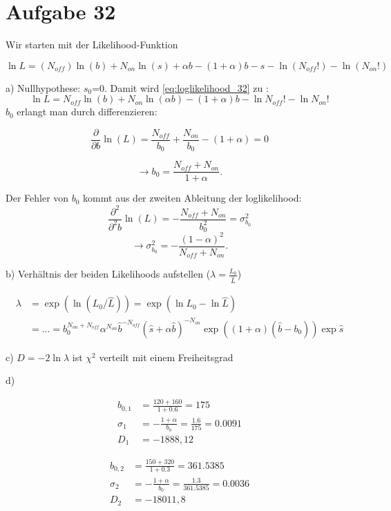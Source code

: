 \section{Aufgabe 32}

Wir starten mit der Likelihood-Funktion

\begin{equation}
	\ln L = (N_{off}) \ln (b) + N_{on} \ln (s) +\alpha b -(1+\alpha) b - s - \ln (N_{off}!) - \ln (N_{on}!)
	\label{eq:loglikelihood_32}
\end{equation}

a) Nullhypothese: $s_0$=0. Damit wird \eqref{eq:loglikelihood_32} zu :
\begin{equation}
	\ln L = N_{off} \ln (b) + N_{on} \ln (\alpha b) -(1+\alpha) b - \ln N_{off}! - \ln N_{on}!
\end{equation}
$b_0$ erlangt man durch differenzieren:

\begin{equation}
	\frac{\partial}{\partial b} \ln (L) = \frac{N_{off}}{b_0} + \frac{N_{on}}{b_0} -(1+\alpha) = 0
\end{equation}

\begin{equation}
	\rightarrow b_0 = \frac{N_{off} + N_{on}}{1+\alpha}.
\end{equation}

Der Fehler von $b_0$ kommt aus der zweiten Ableitung der loglikelihood:
\begin{equation}
	\frac{\partial^2}{\partial^2 b} \ln (L) = -\frac{N_{off} + N_{on}}{b_0^2} = \sigma^2_{b_0}
\end{equation}
\begin{equation}
	\rightarrow \sigma_{b_0}^2 = -\frac{(1-\alpha)^2}{N_{off} + N_{on}}. 
\end{equation}



b) Verhältnis der beiden Likelihoods aufstellen ($\lambda=\frac{L_0}{\hat{L}}$)

\begin{align}
	\lambda &= \exp{(\ln (L_0/\hat{L}))} = \exp{(\ln L_0 - \ln \hat L)} \\
	&= ... = b_0^{N_{on}+N_{off}}\alpha^{N_{on}} \hat{b}^{-N_{off}} (\hat{s} + \alpha\hat{b})^{-N_{on}} \exp{((1+\alpha)(\hat{b}-b_0))} \exp{\hat{s}}
\end{align}


c) $D = -2\ln \lambda$ ist $\chi^2$ verteilt mit einem Freiheitsgrad

d) 

\begin{align}
	b_{0,1} &= \frac{120+160}{1+0.6} = 175 \\
	\sigma_{1} &= -\frac{1+\alpha}{b_0} = \frac{1.6}{175} = 0.0091 \\
	D_1 &= -1888,12
\end{align}

\begin{align}
	b_{0,2} &= \frac{150+320}{1+0.3} = 361.5385 \\
	\sigma_{2} &= -\frac{1+\alpha}{b_0} = \frac{1.3}{361.5385} = 0.0036 \\
	D_2 &= -18011,8
\end{align}
